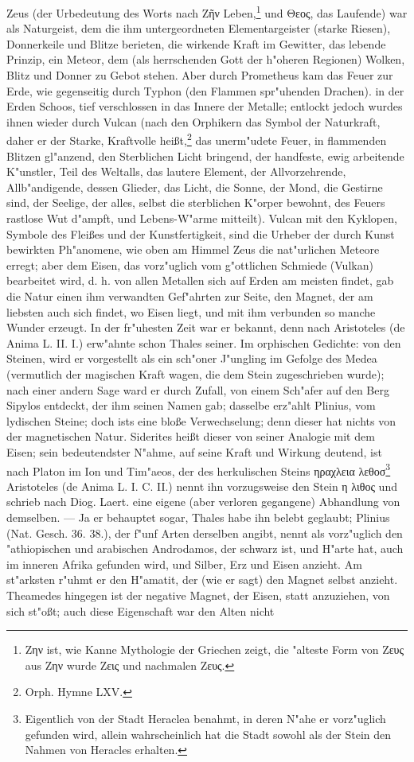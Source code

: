 \documentclass[a4paper, 11pt, oneside, polutonikogreek, german]{article}
\begin{document}
Zeus (der Urbedeutung des Worts nach Ζῆν Leben,\footnote{Ζην ist, wie Kanne Mythologie der Griechen zeigt, die "alteste Form von Ζευς aus Ζην wurde Ζεις und nachmalen Ζευς.} und Θεος, das Laufende) war als Naturgeist, dem die ihm untergeordneten Elementargeister (starke Riesen), Donnerkeile und Blitze berieten, die wirkende Kraft im Gewitter, das lebende Prinzip, ein Meteor, dem (als herrschenden Gott der h"oheren Regionen) Wolken, Blitz und Donner zu Gebot stehen. Aber durch Prometheus kam das Feuer zur Erde, wie gegenseitig durch Typhon (den Flammen spr"uhenden Drachen). in der Erden Schoos, tief verschlossen in das Innere der Metalle; entlockt jedoch wurdes ihnen wieder durch Vulcan (nach den Orphikern das Symbol der Naturkraft, daher er der Starke, Kraftvolle heißt,\footnote{Orph. Hymne LXV.} das unerm"udete Feuer, in flammenden Blitzen gl"anzend, den Sterblichen Licht bringend, der handfeste, ewig arbeitende K"unstler, Teil des Weltalls, das lautere Element, der Allvorzehrende, Allb"andigende, dessen Glieder, das Licht, die Sonne, der Mond, die Gestirne sind, der Seelige, der alles, selbst die sterblichen K"orper bewohnt, des Feuers rastlose Wut d"ampft, und Lebens-W"arme mitteilt). Vulcan mit den Kyklopen, Symbole des Fleißes und der Kunstfertigkeit, sind die Urheber der durch Kunst bewirkten Ph"anomene, wie oben am Himmel Zeus die nat"urlichen Meteore erregt; aber dem Eisen, das vorz"uglich vom g"ottlichen Schmiede (Vulkan) bearbeitet wird, d. h. von allen Metallen sich auf Erden am meisten findet, gab die Natur einen ihm verwandten Gef"ahrten zur Seite, den Magnet, der am liebsten auch sich findet, wo Eisen liegt, und mit ihm verbunden so manche Wunder erzeugt. In der fr"uhesten Zeit war er bekannt, denn nach Aristoteles (de Anima L. II. I.) erw"ahnte schon Thales seiner. Im orphischen Gedichte: von den Steinen, wird er vorgestellt als ein sch"oner J"ungling im Gefolge des Medea (vermutlich der magischen Kraft wagen, die dem Stein zugeschrieben wurde); nach einer andern Sage ward er durch Zufall, von einem Sch"afer auf den Berg Sipylos entdeckt, der ihm seinen Namen gab; dasselbe erz"ahlt Plinius, vom lydischen Steine; doch ists eine bloße Verwechselung; denn dieser hat nichts von der magnetischen Natur. Siderites heißt dieser von seiner Analogie mit dem Eisen; sein bedeutendster N"ahme, auf seine Kraft und Wirkung deutend, ist nach Platon im Ion und Tim"aeos, der des herkulischen Steins ηραχλεια λεθοσ\footnote{Eigentlich von der Stadt Heraclea benahmt, in deren N"ahe er vorz"uglich gefunden wird, allein wahrscheinlich hat die Stadt sowohl als der Stein den Nahmen von Heracles erhalten.} Aristoteles (de Anima L. I. C. II.) nennt ihn vorzugsweise den Stein η λιθος und schrieb nach Diog. Laert. eine eigene (aber verloren gegangene) Abhandlung von demselben. --- Ja er behauptet sogar, Thales habe ihn belebt geglaubt; Plinius (Nat. Gesch. 36. 38.), der f"unf Arten derselben angibt, nennt als vorz"uglich den "athiopischen und arabischen Androdamos, der schwarz ist, und H"arte hat, auch im inneren Afrika gefunden wird, und Silber, Erz und Eisen anzieht. Am st"arksten r"uhmt er den H"amatit, der (wie er sagt) den Magnet selbst anzieht. Theamedes hingegen ist der negative Magnet, der Eisen, statt anzuziehen, von sich st"oßt; auch diese Eigenschaft war den Alten nicht 
\end{document}
